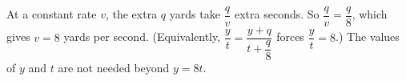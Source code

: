 At a constant rate $v$, the extra $q$ yards take $\dfrac {q}{v}$ extra seconds. So $\dfrac {q}{v}=\dfrac {q}{8}$, which gives $v=\boxed{8}$ yards per second. (Equivalently, $\dfrac {y}{t}=\dfrac{y+q}{t+\dfrac {q}{8}}$ forces $\dfrac {y}{t}=8$.) The values of $y$ and $t$ are not needed beyond $y=8t$.
